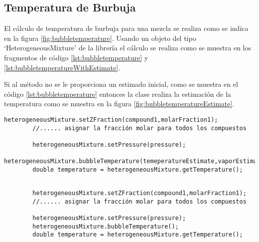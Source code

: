 \subsection{Temperatura de Burbuja}\label{subsec:bubbletemperature}

	El cálculo de temperatura de burbuja para una mezcla se realiza como se indica en la figura \ref{fig:bubbletemperature}. Usando un objeto del tipo `HeterogeneousMixture' de la librería \Materia el cálculo se realiza como se muestra en los fragmentos de código \ref{lst:bubbletemperature} y \ref{lst:bubbletemperatureWithEstimate}.

	Si al método no se le proporciona un estimado inicial, como se muestra en el código \ref{lst:bubbletemperature} entonces la clase realiza la estimación de la temperatura como se muestra en la figura \ref{fig:bubbletemperatureEstimate}. 

	\begin{lstlisting}[label={lst:bubbletemperatureWithEstimate},caption={Cálculo de la temperatura de burbuja proporcionando el estimado inicial de temperatura y de las fracciones molares del vapor.}]		
		heterogeneousMixture.setZFraction(compound1,molarFraction1);
		//...... asignar la fracción molar para todos los compuestos

		heterogeneousMixture.setPressure(pressure);
		heterogeneousMixture.bubbleTemperature(temeperatureEstimate,vaporEstimatedFractions);
		double temperature = heterogeneousMixture.getTemperature();
	\end{lstlisting}


	\begin{lstlisting}[label={lst:bubbletemperature},caption={Cálculo de la temperatura de burbuja.}]

		heterogeneousMixture.setZFraction(compound1,molarFraction1);
		//...... asignar la fracción molar para todos los compuestos

		heterogeneousMixture.setPressure(pressure);
		heterogeneousMixture.bubbleTemperature();
		double temperature = heterogeneousMixture.getTemperature();
	\end{lstlisting}


